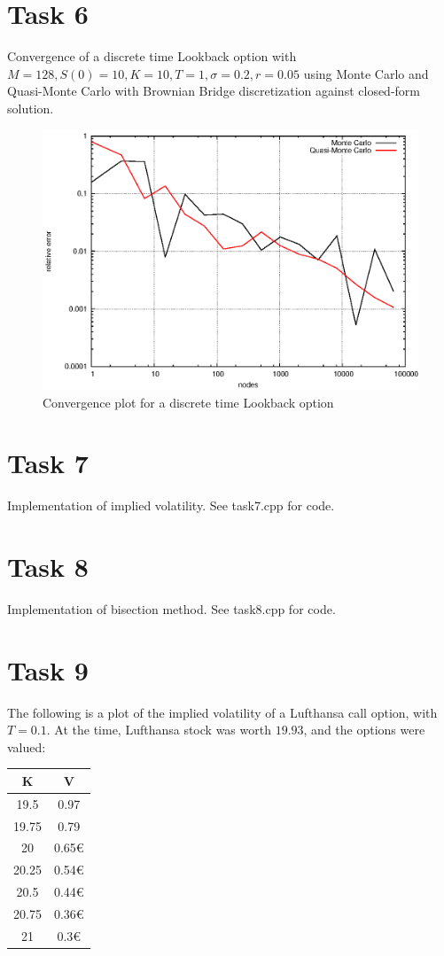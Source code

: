 \documentclass[]{article}
\begin{document}
\section*{Task 6}
Convergence of a discrete time Lookback option with $M=128,S(0)=10,K=10,T=1,\sigma=0.2,r=0.05$ using Monte Carlo and Quasi-Monte Carlo with Brownian Bridge discretization against closed-form solution.
\begin{figure}[!ht]
\centering
\includegraphics[width=.9\textwidth]{task6.eps}
\caption{Convergence plot for a discrete time Lookback option}
\label{fig:Task6}
\end{figure}

\section*{Task 7}
Implementation of implied volatility. See task7.cpp for code.

\section*{Task 8}
Implementation of bisection method. See task8.cpp for code.
\clearpage

\section*{Task 9}
The following is a plot of the implied volatility of a Lufthansa call option, with $T=0.1$. At the time, Lufthansa stock was worth $19.93$, and the options were valued:\\

\centering
\begin{tabular}[ht]{c|c}
K & V\\
\hline
19.5&0.97\\
19.75&0.79\\
20&0.65€\\
20.25&0.54€\\
20.5&0.44€\\
20.75&0.36€\\
21&0.3€\\
\end{tabular}
\end{document}
